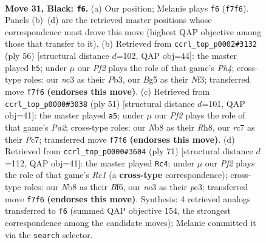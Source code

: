 \documentclass[11pt]{article}
\begin{document}
\clearpage

\begin{figure}[p]\centering
\begin{subfigure}{0.46\textwidth}\centering
\resizebox{\linewidth}{!}{%
\newchessgame
\chessboard[
  setfen={rn5k/2Rn1p2/p2p4/3P2b1/4P1P1/q1NQ4/4N3/4K3 b - - 1 31},
  showmover=false,
  pgfstyle=straightmove, color=movearrow, markmove={f7-f6}
]}
\caption{}
\end{subfigure}\hfill
\begin{subfigure}{0.46\textwidth}\centering
\resizebox{\linewidth}{!}{%
\newchessgame
\chessboard[
  setfen={r4nk1/5pp1/4p3/3nP3/3RN2P/qP3N2/2Q2P2/6K1 w - - 3 29},
  showmover=false,
  pgfstyle=straightmove, color=movearrow, markmove={h4-h5}
]}
\caption{}
\end{subfigure}
\\[4pt]
\begin{subfigure}{0.46\textwidth}\centering
\resizebox{\linewidth}{!}{%
\newchessgame
\chessboard[
  setfen={1k5r/ppp1q3/2n3p1/5b2/P2PNP2/2PQ4/1P1N4/2K1R3 b - - 2 26},
  showmover=false,
  pgfstyle=straightmove, color=movearrow, markmove={a7-a5}
]}
\caption{}
\end{subfigure}\hfill
\begin{subfigure}{0.46\textwidth}\centering
\resizebox{\linewidth}{!}{%
\newchessgame
\chessboard[
  setfen={2r3k1/7p/4pbp1/7n/4q2P/3NP3/P4PR1/3QN1K1 b - - 1 36},
  showmover=false,
  pgfstyle=straightmove, color=movearrow, markmove={c8-c4}
]}
\caption{}
\end{subfigure}
\caption{\textbf{Move 31, Black: \texttt{f6}.} (a) Our position; Melanie plays \texttt{f6} (\texttt{f7f6}). Panels (b)--(d) are the retrieved master positions whose correspondence most drove this move (highest QAP objective among those that transfer to it). (b) Retrieved from \texttt{ccrl\_top\_p0002\#3132} (ply 56) [structural distance $d$=102, QAP obj=44]: the master played \texttt{h5}; under $\mu$ our \emph{Pf2} plays the role of that game's \emph{Ph4}; cross-type roles: our \emph{n}c3 as their \emph{P}b3, our \emph{B}g5 as their \emph{N}f3; transferred move \texttt{f7f6} \textbf{(endorses this move)}. (c) Retrieved from \texttt{ccrl\_top\_p0000\#3038} (ply 51) [structural distance $d$=101, QAP obj=41]: the master played \texttt{a5}; under $\mu$ our \emph{Pf2} plays the role of that game's \emph{Pa2}; cross-type roles: our \emph{N}b8 as their \emph{R}h8, our \emph{r}c7 as their \emph{P}c7; transferred move \texttt{f7f6} \textbf{(endorses this move)}. (d) Retrieved from \texttt{ccrl\_top\_p0000\#3604} (ply 71) [structural distance $d$=112, QAP obj=41]: the master played \texttt{Rc4}; under $\mu$ our \emph{Pf2} plays the role of that game's \emph{Rc1} (a \textbf{cross-type} correspondence); cross-type roles: our \emph{N}b8 as their \emph{B}f6, our \emph{n}c3 as their \emph{p}e3; transferred move \texttt{f7f6} \textbf{(endorses this move)}. Synthesis: 4 retrieved analogs transferred to \texttt{f6} (summed QAP objective 154, the strongest correspondence among the candidate moves); Melanie committed it via the \texttt{search} selector.}
\label{fig:thought-m61}
\end{figure}
\end{document}
